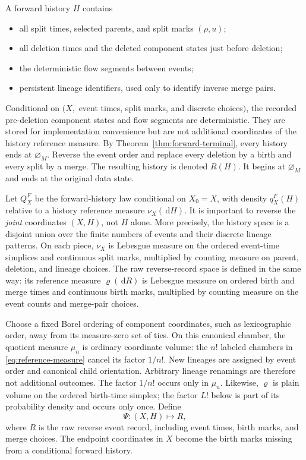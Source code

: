 \documentclass[10pt]{article}
\theoremstyle{definition}
\theoremstyle{remark}
\newcommand{\dd}{\,\mathrm{d}}
\newcommand{\emptyconfig}{\varnothing_M}
\begin{document}
A forward history $H$ contains
\begin{itemize}
  \item all split times, selected parents, and split marks $(\rho,u)$;
  \item all deletion times and the deleted component states just before deletion;
  \item the deterministic flow segments between events;
  \item persistent lineage identifiers, used only to identify inverse merge pairs.
\end{itemize}
Conditional on $(X,$ event times, split marks, and discrete choices$)$, the
recorded pre-deletion component states and flow segments are deterministic.
They are stored for implementation convenience but are not additional
coordinates of the history reference measure.
By Theorem~\ref{thm:forward-terminal}, every history ends at $\emptyconfig$.  Reverse the event order and replace every deletion by a birth and every split by a merge.  The resulting history is denoted $R(H)$.  It begins at $\emptyconfig$ and ends at the original data state.

Let $Q_X^F$ be the forward-history law conditional on $X_0=X$, with density
$q_X^F(H)$ relative to a history reference measure $\nu_X(\dd H)$.  It is
important to reverse the \emph{joint} coordinates $(X,H)$, not $H$ alone.
More precisely, the history space is a disjoint union over the finite
numbers of events and their discrete lineage patterns.  On each piece,
$\nu_X$ is Lebesgue measure on the ordered event-time simplices and
continuous split marks, multiplied by counting measure on parent, deletion,
and lineage choices.  The raw reverse-record space is defined in the same
way: its reference measure $\varrho(\dd R)$ is Lebesgue measure on ordered
birth and merge times and continuous birth marks, multiplied by counting
measure on the event counts and merge-pair choices.

Choose a fixed Borel ordering of component coordinates, such as
lexicographic order, away from its measure-zero set of ties.  On this
canonical chamber, the quotient measure $\mu_n$ is ordinary coordinate
volume: the $n!$ labeled chambers in
\eqref{eq:reference-measure} cancel its factor $1/n!$.  New lineages are
assigned by event order and canonical child orientation.  Arbitrary lineage
renamings are therefore not additional outcomes.  The factor $1/n!$ occurs
only in $\mu_n$.  Likewise, $\varrho$ is plain volume on the ordered
birth-time simplex; the factor $L!$ below is part of its probability density
and occurs only once.
Define
\begin{equation}
  \Psi:(X,H)\longmapsto R,
  \label{eq:joint-reversal-map}
\end{equation}
where $R$ is the raw reverse event record, including event times, birth
marks, and merge choices.  The endpoint coordinates in $X$ become the birth
marks missing from a conditional forward history.
\end{document}
